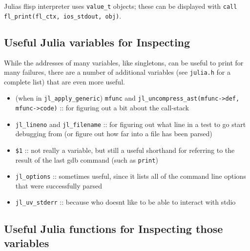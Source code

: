 Julia{\textquotesingle}s flisp interpreter uses \texttt{value\_t} objects; these can be displayed with \texttt{call fl\_print(fl\_ctx, ios\_stdout, obj)}.



\hypertarget{13194055767125353293}{}


\subsection{Useful Julia variables for Inspecting}



While the addresses of many variables, like singletons, can be useful to print for many failures, there are a number of additional variables (see \texttt{julia.h} for a complete list) that are even more useful.



\begin{itemize}
\item (when in \texttt{jl\_apply\_generic}) \texttt{mfunc} and \texttt{jl\_uncompress\_ast(mfunc->def, mfunc->code)} :: for figuring out a bit about the call-stack


\item \texttt{jl\_lineno} and \texttt{jl\_filename} :: for figuring out what line in a test to go start debugging from (or figure out how far into a file has been parsed)


\item \texttt{\$1} :: not really a variable, but still a useful shorthand for referring to the result of the last gdb command (such as \texttt{print})


\item \texttt{jl\_options} :: sometimes useful, since it lists all of the command line options that were successfully parsed


\item \texttt{jl\_uv\_stderr} :: because who doesn{\textquotesingle}t like to be able to interact with stdio

\end{itemize}


\hypertarget{7178558395386377758}{}


\subsection{Useful Julia functions for Inspecting those variables}



